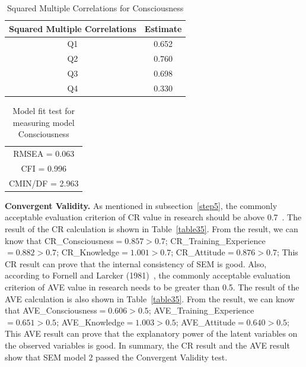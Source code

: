 \begin{table}[h]
  \caption{Squared Multiple Correlations for Consciousness}
  \label{table25}
  \centering
  \begin{tabular}{c|c}
  \hline
   Squared Multiple Correlations & Estimate \\
  \hline
  Q1  & 0.652 \\
  Q2  & 0.760 \\
  Q3  & 0.698 \\
  Q4  & 0.330 \\
  \hline
  \end{tabular}
\end{table}

\begin{table}[h]
  \caption{Model fit test for measuring model Consciousness}
  \label{table26}
  \centering 
  \begin{tabular}{|c|}
  \hline
  RMSEA = 0.063 \\
  CFI = 0.996 \\
  CMIN/DF = 2.963 \\
  \hline
  \end{tabular}
\end{table}

\textbf{Convergent Validity.} As mentioned in subsection~\ref{step5}, the commonly acceptable evaluation criterion of CR value in research should be above 0.7~\cite{ref32}. The result of the CR calculation is shown in Table~\ref{table35}. From the result, we can know that CR\_Consciousness$=0.857>0.7$; CR\_Training\_Experience$=0.882>0.7$; CR\_Knowledge$=1.001>0.7$; CR\_Attitude$=0.876>0.7$; This CR result can prove that the internal consistency of SEM is good. Also, according to Fornell and Larcker (1981)~\cite{ref31}, the commonly acceptable evaluation criterion of AVE value in research needs to be greater than 0.5. The result of the AVE calculation is also shown in Table~\ref{table35}. From the result, we can know that AVE\_Consciousness$=0.606>0.5$; AVE\_Training\_Experience$=0.651>0.5$; AVE\_Knowledge$=1.003>0.5$; AVE\_Attitude$=0.640>0.5$; This AVE result can prove that the explanatory power of the latent variables on the observed variables is good. In summary, the CR result and the AVE result show that SEM model 2 passed the Convergent Validity test. 

